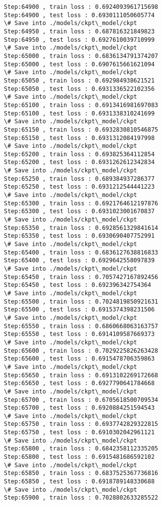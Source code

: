 \documentclass[11pt]{article}
\begin{document}
\begin{Verbatim}[commandchars=\\\{\}]
Step:64900 , train loss : 0.6924093961715698
Step:64900 , test loss : 0.6930111050605774
\# Save into ./models/ckpt\_model/ckpt
Step:64950 , train loss : 0.687816321849823
Step:64950 , test loss : 0.6927610039710999
\# Save into ./models/ckpt\_model/ckpt
Step:65000 , train loss : 0.6836134791374207
Step:65000 , test loss : 0.6907615661621094
\# Save into ./models/ckpt\_model/ckpt
Step:65050 , train loss : 0.692984938621521
Step:65050 , test loss : 0.6931336522102356
\# Save into ./models/ckpt\_model/ckpt
Step:65100 , train loss : 0.6913416981697083
Step:65100 , test loss : 0.6931338310241699
\# Save into ./models/ckpt\_model/ckpt
Step:65150 , train loss : 0.6932830810546875
Step:65150 , test loss : 0.6931312084197998
\# Save into ./models/ckpt\_model/ckpt
Step:65200 , train loss : 0.693825364112854
Step:65200 , test loss : 0.6931262612342834
\# Save into ./models/ckpt\_model/ckpt
Step:65250 , train loss : 0.689384937286377
Step:65250 , test loss : 0.6931212544441223
\# Save into ./models/ckpt\_model/ckpt
Step:65300 , train loss : 0.6921764612197876
Step:65300 , test loss : 0.6931023001670837
\# Save into ./models/ckpt\_model/ckpt
Step:65350 , train loss : 0.6928561329841614
Step:65350 , test loss : 0.6930690407752991
\# Save into ./models/ckpt\_model/ckpt
Step:65400 , train loss : 0.6836127638816833
Step:65400 , test loss : 0.6929642558097839
\# Save into ./models/ckpt\_model/ckpt
Step:65450 , train loss : 0.7057427167892456
Step:65450 , test loss : 0.692396342754364
\# Save into ./models/ckpt\_model/ckpt
Step:65500 , train loss : 0.7024819850921631
Step:65500 , test loss : 0.6915374398231506
\# Save into ./models/ckpt\_model/ckpt
Step:65550 , train loss : 0.6860668063163757
Step:65550 , test loss : 0.6914109587669373
\# Save into ./models/ckpt\_model/ckpt
Step:65600 , train loss : 0.7029225826263428
Step:65600 , test loss : 0.6915478706359863
\# Save into ./models/ckpt\_model/ckpt
Step:65650 , train loss : 0.6913102269172668
Step:65650 , test loss : 0.6927790641784668
\# Save into ./models/ckpt\_model/ckpt
Step:65700 , train loss : 0.6705618500709534
Step:65700 , test loss : 0.6920884251594543
\# Save into ./models/ckpt\_model/ckpt
Step:65750 , train loss : 0.6937742829322815
Step:65750 , test loss : 0.6910302042961121
\# Save into ./models/ckpt\_model/ckpt
Step:65800 , train loss : 0.6842358112335205
Step:65800 , test loss : 0.6915481686592102
\# Save into ./models/ckpt\_model/ckpt
Step:65850 , train loss : 0.6837525367736816
Step:65850 , test loss : 0.6918789148330688
\# Save into ./models/ckpt\_model/ckpt
Step:65900 , train loss : 0.7028802633285522

\end{Verbatim}
\end{document}
